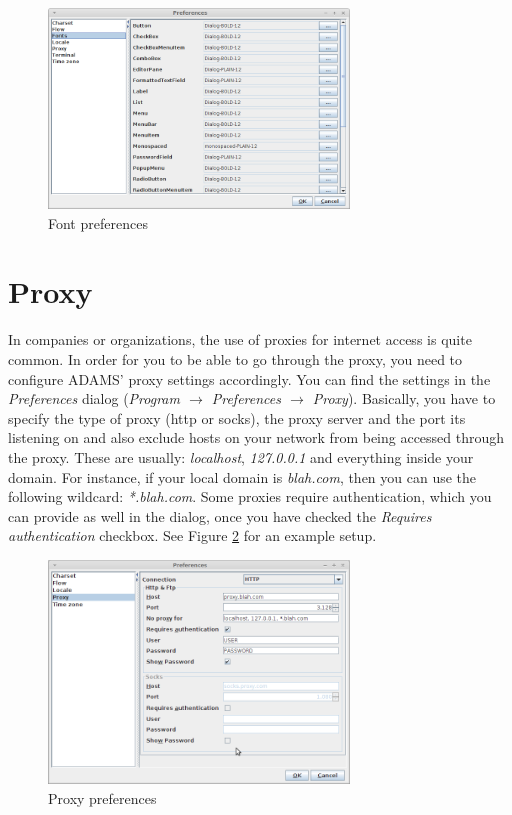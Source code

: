 \begin{figure}[htb]
  \centering
  \includegraphics[width=8.0cm]{images/fonts_setup.png}
  \caption{Font preferences}
  \label{fonts_setup}
\end{figure}

\section{Proxy}
In companies or organizations, the use of proxies for internet access is quite
common. In order for you to be able to go through the proxy, you need to 
configure ADAMS' proxy settings accordingly. You can find the settings in the
\textit{Preferences} dialog (\textit{Program $\rightarrow$ Preferences $\rightarrow$ Proxy}).
Basically, you have to specify the type of proxy (http or socks), the proxy server 
and the port its listening on and also exclude hosts on your network from being 
accessed through the proxy. These are usually: \textit{localhost}, \textit{127.0.0.1} 
and everything inside your domain. For instance, if your local domain is 
\textit{blah.com}, then you can use the following wildcard: \textit{*.blah.com}. 
Some proxies require authentication, which you can provide as well in the dialog,
once you have checked the \textit{Requires authentication} checkbox.
See Figure \ref{proxy_setup} for an example setup.

\begin{figure}[htb]
  \centering
  \includegraphics[width=8.0cm]{images/proxy_setup.png}
  \caption{Proxy preferences}
  \label{proxy_setup}
\end{figure}


